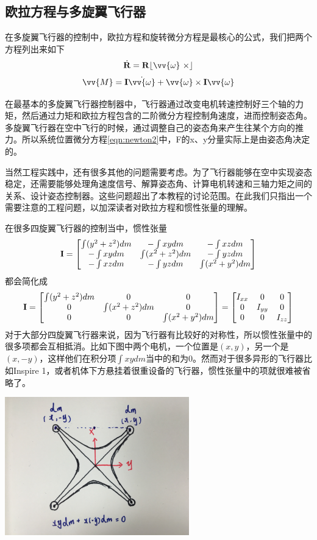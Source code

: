 \documentclass[11pt]{article}
\begin{document}
\subsection{欧拉方程与多旋翼飞行器}
在多旋翼飞行器的控制中，欧拉方程和旋转微分方程是最核心的公式，我们把两个方程列出来如下
$$
\dot{{\bf R}} = {\bf R}\lfloor \vv{\omega} \ \times \rfloor
$$
$$
\vv{M} = {\bf I}\dot{\vv{\omega}} + \vv{\omega} \times {\bf I}\vv{\omega}
$$

在最基本的多旋翼飞行器控制器中，飞行器通过改变电机转速控制好三个轴的力矩，然后通过力矩和欧拉方程包含的二阶微分方程控制角速度，进而控制姿态角。多旋翼飞行器在空中飞行的时候，通过调整自己的姿态角来产生往某个方向的推力。所以系统位置微分方程\ref{eqn:newton2}中，F的x、y分量实际上是由姿态角决定的。

当然工程实践中，还有很多其他的问题需要考虑。为了飞行器能够在空中实现姿态稳定，还需要能够处理角速度信号、解算姿态角、计算电机转速和三轴力矩之间的关系、设计姿态控制器。这些问题超出了本教程的讨论范围。在此我们只指出一个需要注意的工程问题，以加深读者对欧拉方程和惯性张量的理解。

在很多四旋翼飞行器的控制当中，惯性张量
$$
{\bf I} = 
\begin{bmatrix}
\int (y^2+z^2) dm	&	-\int xy dm		&	-\int xz dm	\\
-\int xy dm		&	\int (x^2+z^2) dm	&	-\int yz dm	\\
-\int xz dm		&	-\int yz dm		&	\int (x^2+y^2) dm
\end{bmatrix}
$$
都会简化成
\begin{equation}\label{eqn:simpleintertia}
{\bf I} = 
\begin{bmatrix}
\int (y^2+z^2) dm	&	0		&	0	\\
0		&	\int (x^2+z^2) dm	&	0	\\
0		&	0		&	\int (x^2+y^2) dm
\end{bmatrix} = 
\begin{bmatrix}
I_{xx}	&	0		&	0	\\
0		&	I_{yy}	&	0	\\
0		&	0		&	I_{zz}
\end{bmatrix}
\end{equation}
对于大部分四旋翼飞行器来说，因为飞行器有比较好的对称性，所以惯性张量中的很多项都会互相抵消。比如下图中两个电机，一个位置是$(x,y)$，另一个是$(x,-y)$，这样他们在积分项$\int xy dm$当中的和为0。然而对于很多异形的飞行器比如Inspire 1，或者机体下方悬挂着很重设备的飞行器，惯性张量中的项就很难被省略了。

\begin{center}
\includegraphics[width=0.6\textwidth]{images/IMG_2301.jpg}
\end{center}
\end{document}
